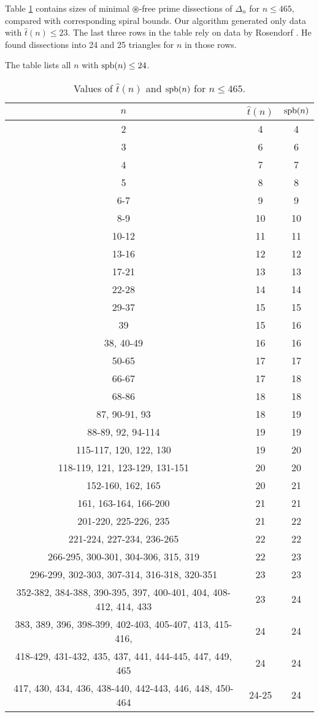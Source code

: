 \setcounter{chapter}{1}

Table \ref{tab:tp} contains sizes of minimal $\circledast$-free prime dissections of $\Delta_n$ for $n \leq 465$, compared with corresponding spiral bounds. Our algorithm generated only data with $\hat t(n) \leq 23$. The last three rows in the table rely on data by Rosendorf \cite{Rosendorf04}. He found dissections into 24 and 25 triangles for $n$ in those rows.

The table lists all $n$ with $\mathop{\mathrm{spb}}(n) \leq 24$.

\begin{table}[ht]
	\centering
	\begin{tabular} {c | c c}
		$n$ & $\hat{t}(n)$ & $\mathop{\mathrm{spb}}(n)$ \\ \hline
		2 & 4 & 4 \\
		3 & 6 & 6 \\
		4 & 7 & 7 \\
		5 & 8 & 8 \\
		6-7 & 9 & 9 \\
		8-9 & 10 & 10 \\
		10-12 & 11 & 11 \\
		13-16 & 12 & 12 \\
		17-21 & 13 & 13 \\
		22-28 & 14 & 14 \\
		29-37 & 15 & 15 \\
		39 & 15 & 16 \\
		38, 40-49 & 16 & 16 \\
		50-65 & 17 & 17 \\
		66-67 & 17 & 18 \\
		68-86 & 18 & 18 \\
		87, 90-91, 93 & 18 & 19 \\
		88-89, 92, 94-114 & 19 & 19 \\
		115-117, 120, 122, 130 & 19 & 20 \\
		118-119, 121, 123-129, 131-151 & 20 & 20 \\
		152-160, 162, 165 & 20 & 21 \\
		161, 163-164, 166-200 & 21 & 21 \\
		201-220, 225-226, 235 & 21 & 22 \\
		221-224, 227-234, 236-265 & 22 & 22 \\
		266-295, 300-301, 304-306, 315, 319 & 22 & 23 \\
		296-299, 302-303, 307-314, 316-318, 320-351 & 23 & 23 \\
		352-382, 384-388, 390-395, 397, 400-401, 404, 408-412, 414, 433 & 23 & 24 \\
		383, 389, 396, 398-399, 402-403, 405-407, 413, 415-416, & 24 & 24 \\
		418-429, 431-432, 435, 437, 441, 444-445, 447, 449, 465 & 24 & 24 \\
		417, 430, 434, 436, 438-440, 442-443, 446, 448, 450-464 & 24-25 & 24
	\end{tabular}
	\caption{Values of $\hat{t}(n)$ and $\mathop{\mathrm{spb}}(n)$ for $n \leq 465$.}
	\label{tab:tp}
\end{table}


